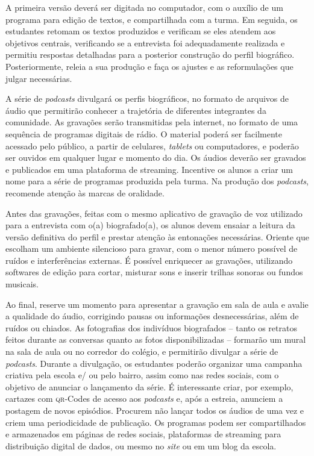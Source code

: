 \documentclass[12pt]{extarticle}
\begin{document}
A primeira versão deverá ser digitada no computador, com o auxílio de um
programa para edição de textos, e compartilhada com a turma. Em seguida,
os estudantes retomam os textos produzidos e verificam se eles atendem
aos objetivos centrais, verificando se a entrevista foi adequadamente
realizada e permitiu respostas detalhadas para a posterior construção do
perfil biográfico. Posteriormente, releia a sua produção e faça os
ajustes e as reformulações que julgar necessárias.

A série de \emph{podcasts} divulgará os perfis biográficos, no formato
de arquivos de áudio que permitirão conhecer a trajetória de diferentes
integrantes da comunidade. As gravações serão transmitidas pela
internet, no formato de uma sequência de programas digitais de rádio. O
material poderá ser facilmente acessado pelo público, a partir de
celulares, \emph{tablets} ou computadores, e poderão ser ouvidos em
qualquer lugar e momento do dia. Os áudios deverão ser gravados e
publicados em uma plataforma de streaming. Incentive os alunos a criar
um nome para a série de programas produzida pela turma. Na produção dos
\emph{podcasts}, recomende atenção às marcas de oralidade.

Antes das gravações, feitas com o mesmo aplicativo de gravação de voz
utilizado para a entrevista com o(a) biografado(a), os alunos devem
ensaiar a leitura da versão definitiva do perfil e prestar atenção às
entonações necessárias. Oriente que escolham um ambiente silencioso para
gravar, com o menor número possível de ruídos e interferências externas.
É possível enriquecer as gravações, utilizando softwares de edição para
cortar, misturar sons e inserir trilhas sonoras ou fundos musicais.

Ao final, reserve um momento para apresentar a gravação em sala de aula
e avalie a qualidade do áudio, corrigindo pausas ou informações
desnecessárias, além de ruídos ou chiados. As fotografias dos indivíduos
biografados -- tanto os retratos feitos durante as conversas quanto as
fotos disponibilizadas -- formarão um mural na sala de aula ou no
corredor do colégio, e permitirão divulgar a série de \emph{podcasts}.
Durante a divulgação, os estudantes poderão organizar uma campanha
criativa pela escola e/ ou pelo bairro, assim como nas redes sociais,
com o objetivo de anunciar o lançamento da série. É interessante criar,
por exemplo, cartazes com \textsc{qr}-Codes de acesso aos \emph{podcasts} e, após
a estreia, anunciem a postagem de novos episódios. Procurem não lançar
todos os áudios de uma vez e criem uma periodicidade de publicação. Os
programas podem ser compartilhados e armazenados em páginas de redes
sociais, plataformas de streaming para distribuição digital de dados, ou
mesmo no \emph{site} ou em um blog da escola.
\end{document}
